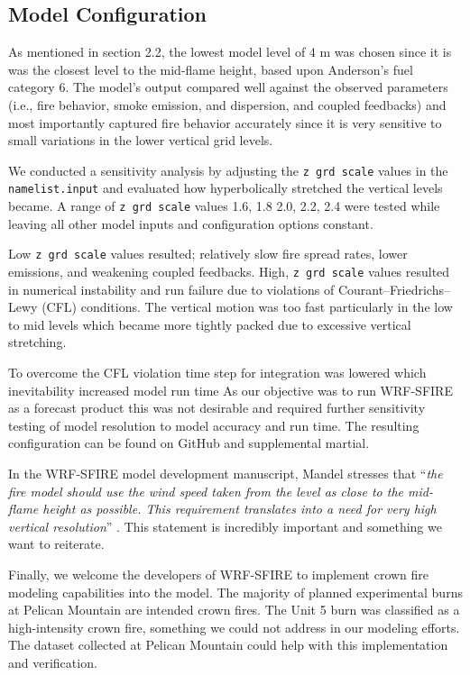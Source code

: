 \documentclass[preprints,article,accept,moreauthors,pdftex]{Definitions/mdpi}
\begin{document}
\subsection{Model Configuration}

As mentioned in section 2.2, the lowest model level of 4 m was chosen since it is was the closest level to the mid-flame height, based upon Anderson’s fuel category 6. The model’s output compared well against the observed parameters (i.e., fire behavior, smoke emission, and dispersion, and coupled feedbacks) and most importantly captured fire behavior accurately since it is very sensitive to small variations in the lower vertical grid levels.

We conducted a sensitivity analysis by adjusting the \texttt{z grd scale} values in the \texttt{namelist.input} and evaluated how hyperbolically stretched the vertical levels became. A range of \texttt{z grd scale} values 1.6, 1.8 2.0, 2.2, 2.4 were tested while leaving all other model inputs and configuration options constant.

Low \texttt{z grd scale} values resulted; relatively slow fire spread rates, lower emissions, and weakening coupled feedbacks. High, \texttt{z grd scale} values resulted in numerical instability and run failure due to violations of Courant–Friedrichs–Lewy (CFL) conditions. The vertical motion was too fast particularly in the low to mid levels which became more tightly packed due to excessive vertical stretching.

To overcome the CFL violation time step for integration was lowered which inevitability increased model run time As our objective was to run WRF-SFIRE as a forecast product this was not desirable and required further sensitivity testing of model resolution to model accuracy and run time. The resulting configuration can be found on GitHub and supplemental martial.


In the WRF-SFIRE model development manuscript, Mandel stresses that ``\textit{the fire model should use the wind speed taken from the level as close to the mid-flame height as possible. This requirement translates into a need for very high vertical resolution}'' \cite{mandel_coupled_2011}. This statement is incredibly important and something we want to reiterate.

Finally, we welcome the developers of WRF-SFIRE to implement crown fire modeling capabilities into the model. The majority of planned experimental burns at Pelican Mountain are intended crown fires. The Unit 5 burn was classified as a high-intensity crown fire, something we could not address in our modeling efforts. The dataset collected at Pelican Mountain could help with this implementation and verification.
\end{document}
